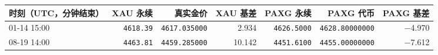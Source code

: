 \begin{tabular}{lrrrrrr}
\toprule
时刻（UTC，分钟结束） & XAU 永续 & 真实金价 & XAU 基差 & PAXG 永续 & PAXG 代币 & PAXG 基差 \\
\midrule
01-14 15:00 & \texttt{4618.39} & \texttt{4617.035000} & 2.934 & \texttt{4626.5000} & \texttt{4628.80000000} & −4.970 \\
08-19 14:00 & \texttt{4463.81} & \texttt{4459.285000} & 10.142 & \texttt{4451.6100} & \texttt{4455.00000000} & −7.612 \\
\bottomrule
\end{tabular}
